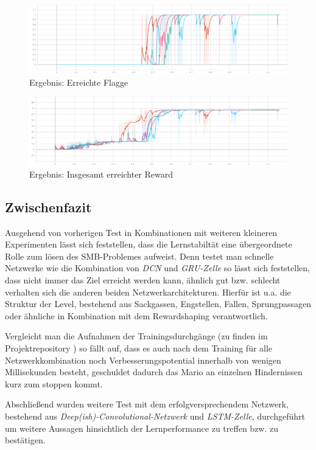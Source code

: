 \documentclass[sigconf,nonacm]{acmart}
\begin{document}
\begin{figure}[hbt!]
\includegraphics[angle=90,scale=0.385]{images/flag.png}
\caption{Ergebnis: Erreichte Flagge}
\label{fig:flag}
\end{figure}

\begin{figure}[hbt!]
\includegraphics[angle=90,scale=0.385]{images/sum_reward.png}
\caption{Ergebnis: Insgesamt erreichter Reward}
\label{fig:reward}
\end{figure}

\subsection{Zwischenfazit}

Ausgehend von vorherigen Test in Kombinationen mit weiteren kleineren Experimenten lässt sich feststellen, dass die Lernstabiltät eine übergeordnete Rolle zum lösen des SMB-Problemes aufweist. Denn testet man schnelle Netzwerke wie die Kombination von \textit{DCN} und \textit{GRU-Zelle} so lässt sich feststellen, dass nicht immer das Ziel erreicht werden kann, ähnlich gut bzw. schlecht verhalten sich die anderen beiden Netzwerkarchitekturen. Hierfür ist u.a. die Struktur der Level, bestehend aus Sackgassen, Engstellen, Fallen, Sprungpassagen oder ähnliche in Kombination mit dem Rewardshaping verantwortlich.

Vergleicht man die Aufnahmen der Trainingsdurchgänge (zu finden im Projektrepository \cite{selfgit}) so fällt auf, dass es auch nach dem Training für alle Netzwerkkombination noch Verbesserungspotential innerhalb von wenigen Millisekunden besteht, geschuldet dadurch das Mario an einzelnen Hindernissen kurz zum stoppen kommt.

Abschließend wurden weitere Test mit dem erfolgversprechendem Netzwerk, bestehend aus \textit{Deep(ish)-Convolutional-Netzwerk} und \textit{LSTM-Zelle}, durchgeführt um weitere Aussagen hinsichtlich der Lernperformance zu treffen bzw. zu bestätigen.
\end{document}
